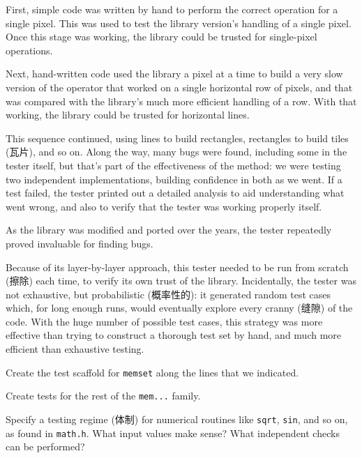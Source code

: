 First, simple code was written by hand to perform the correct operation for
a single pixel. This was used to test the library version's handling of a
single pixel. Once this stage was working, the library could be trusted for
single-pixel operations.

Next, hand-written code used the library a pixel at a time to build a very
slow version of the operator that worked on a single horizontal row of
pixels, and that was compared with the library's much more efficient
handling of a row. With that working, the library could be trusted for
horizontal lines.

This sequence continued, using lines to build rectangles, rectangles to
build tiles (瓦片), and so on. Along the way, many bugs were found,
including some in the tester itself, but that's part of the effectiveness
of the method: we were testing two independent implementations, building
confidence in both as we went. If a test failed, the tester printed out a
detailed analysis to aid understanding what went wrong, and also to verify
that the tester was working properly itself.

As the library was modified and ported over the years, the tester
repeatedly proved invaluable for finding bugs.

Because of its layer-by-layer approach, this tester needed to be run from
scratch (擦除) each time, to verify its own trust of the library.
Incidentally, the tester was not exhaustive, but probabilistic (概率性的):
it generated random test cases which, for long enough runs, would
eventually explore every cranny (缝隙) of the code. With the huge number of
possible test cases, this strategy was more effective than trying to
construct a thorough test set by hand, and much more efficient than
exhaustive testing.

\begin{exercise}
    Create the test scaffold for \verb'memset' along the lines that we
    indicated.
\end{exercise}

\begin{exercise}
    Create tests for the rest of the \verb'mem...' family.
\end{exercise}

\begin{exercise}
    Specify a testing regime (体制) for numerical routines like
    \verb'sqrt', \verb'sin', and so on, as found in \verb'math.h'. What
    input values make sense? What independent checks can be performed?
\end{exercise}

